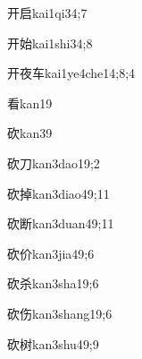 \begin{verbete}{开启}{kai1qi3}{4;7}
\end{verbete}

\begin{verbete}{开始}{kai1shi3}{4;8}
\end{verbete}

\begin{verbete}{开夜车}{kai1ye4che1}{4;8;4}
\end{verbete}

\begin{verbete}{看}{kan1}{9}
\end{verbete}

\begin{verbete}{砍}{kan3}{9}
\end{verbete}

\begin{verbete}{砍刀}{kan3dao1}{9;2}
\end{verbete}

\begin{verbete}{砍掉}{kan3diao4}{9;11}
\end{verbete}

\begin{verbete}{砍断}{kan3duan4}{9;11}
\end{verbete}

\begin{verbete}{砍价}{kan3jia4}{9;6}
\end{verbete}

\begin{verbete}{砍杀}{kan3sha1}{9;6}
\end{verbete}

\begin{verbete}{砍伤}{kan3shang1}{9;6}
\end{verbete}

\begin{verbete}{砍树}{kan3shu4}{9;9}
\end{verbete}

